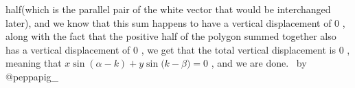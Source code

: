 \documentclass[12pt]{article}
\begin{document}
half(which is the parallel pair of the white vector that would be interchanged later), and we know that this sum happens to have a vertical displacement of $0$ , along with the fact that the positive half of the polygon summed together also has a vertical displacement of $0$ , we get that the total vertical displacement is $0$ , meaning that $x\sin{(\alpha{}-k)}+y\sin{(k-\beta{}})=0$ , and we are done. ~by @peppapig_
\end{document}
